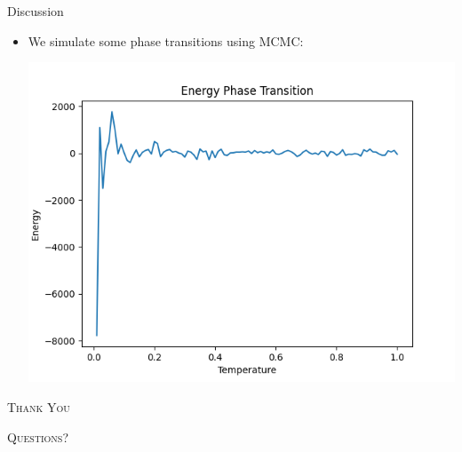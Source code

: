\documentclass{minesbeamer}
\begin{document}
\begin{frame}{Discussion}
    \begin{itemize}        
        \item We simulate some phase transitions using MCMC:
        \centering

        \includegraphics[height=0.6\textheight]{mcmc_phase.png}
    \end{itemize}
\end{frame}
\begin{frame}[standout]
    \Huge\textsc{Thank You}
    
    \vfill
    
    \LARGE\textsc{Questions?}
\end{frame}
\end{document}
